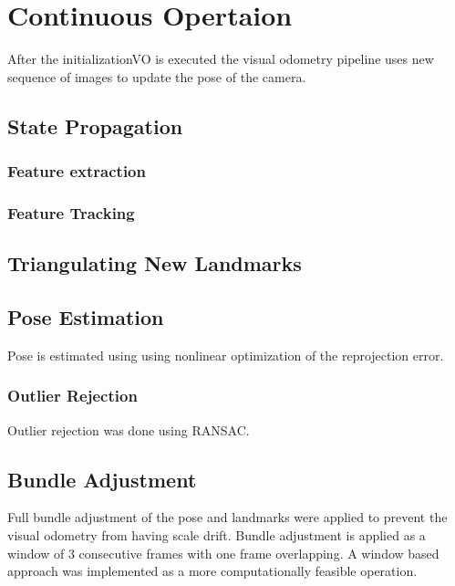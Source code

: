 \chapter{Continuous Opertaion}
After the initializationVO is executed the visual odometry pipeline uses new sequence of images to update the pose of the camera. 

\section{State Propagation}

\subsection{Feature extraction}

\subsection{Feature Tracking}

\section{Triangulating New Landmarks}

\section{Pose Estimation}
Pose is estimated using using nonlinear optimization of the reprojection error. 


\subsection{Outlier Rejection}
Outlier rejection was done using RANSAC.


\section{Bundle Adjustment}
Full bundle adjustment of the pose and landmarks were applied to prevent the visual odometry from having scale drift. Bundle adjustment is applied as a window of 3 consecutive frames with one frame overlapping. A window based approach was implemented as a more computationally feasible operation. 
